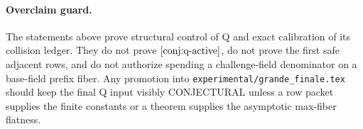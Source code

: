 \paragraph{Overclaim guard.}
The statements above prove structural control of Q and exact calibration of its
collision ledger.  They do not prove \(\cref{conj:q-active}\), do not prove the
first safe adjacent rows, and do not authorize spending a challenge-field
denominator on a base-field prefix fiber.  Any promotion into
\texttt{experimental/grande\_finale.tex} should keep the final Q input visibly
CONJECTURAL unless a row packet supplies the finite constants or a theorem
supplies the asymptotic max-fiber flatness.
